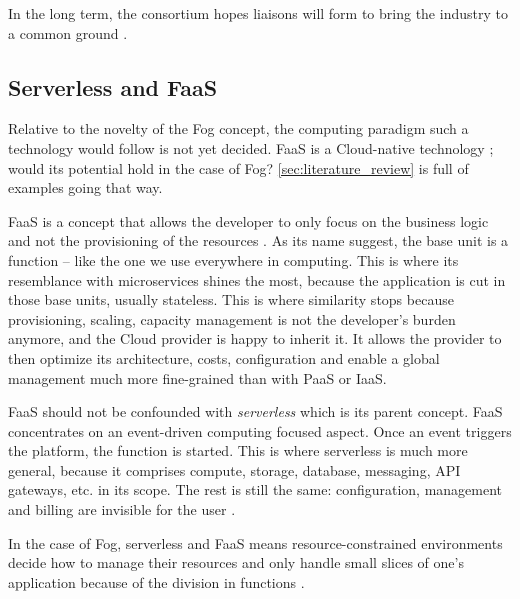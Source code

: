\documentclass[11pt]{sdm}
\begin{document}

In the long term, the consortium hopes liaisons will form to bring the industry to a common ground \cite{ieee_standards_association_ieee_2018}.

\hypersetup{linkcolor=}
\subsection{Serverless and \acrfull{FaaS}}

Relative to the novelty of the Fog concept, the computing paradigm such a technology would follow is not yet decided. \gls{FaaS} is a Cloud-native technology ; would its potential hold in the case of Fog? \ref{sec:literature_review} is full of examples going that way.

\gls{FaaS} is a concept that allows the developer to only focus on the business logic and not the provisioning of the resources \cite{redhat_what_2020}. As its name suggest, the base unit is a function -- like the one we use everywhere in computing. This is where its resemblance with microservices shines the most, because the application is cut in those base units, usually stateless. This is where similarity stops because provisioning, scaling, capacity management is not the developer's burden anymore, and the Cloud provider is happy to inherit it. It allows the provider to then optimize its architecture, costs, configuration and enable a global management much more fine-grained than with \gls{PaaS} or \gls{IaaS}.

\gls{FaaS} should not be confounded with \emph{serverless} which is its parent concept. \gls{FaaS} concentrates on an event-driven computing focused aspect. Once an event triggers the platform, the function is started. This is where serverless is much more general, because it comprises compute, storage, database, messaging, API gateways, etc. in its scope. The rest is still the same: configuration, management and billing are invisible for the user \cite{ibm_faas_2019}.

In the case of Fog, serverless and \gls{FaaS} means resource-constrained environments decide how to manage their resources and only handle small slices of one's application because of the division in functions \cite{bermbach_auctionwhisk_2021}.
\end{document}
